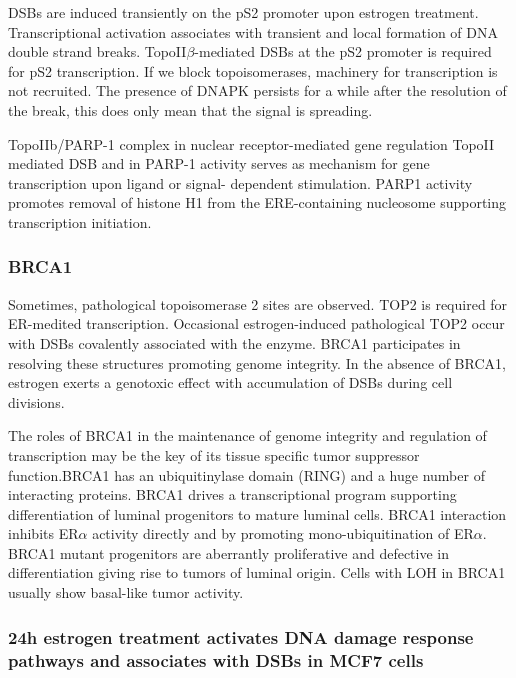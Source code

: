 DSBs are induced transiently on the pS2 promoter upon estrogen treatment. Transcriptional activation associates with transient and local formation of DNA double strand breaks. TopoII$\beta$-mediated DSBs at the pS2 promoter is required for pS2 transcription. If we block topoisomerases, machinery for transcription is not recruited. The presence of DNAPK persists for a while after the resolution of the break, this does only mean that the signal is spreading.

TopoIIb/PARP-1 complex in nuclear receptor-mediated gene regulation TopoII mediated DSB and in PARP-1 activity serves as mechanism for gene transcription upon ligand or signal- dependent stimulation. PARP1 activity promotes removal of histone H1 from the ERE-containing nucleosome supporting transcription initiation.

\hypertarget{brca1}{%
\subsubsection{BRCA1}\label{brca1}}

Sometimes, pathological topoisomerase 2 sites are observed. TOP2 is required for ER-medited transcription. Occasional estrogen-induced pathological TOP2 occur with DSBs covalently associated with the enzyme. BRCA1 participates in resolving these structures promoting genome integrity. In the absence of BRCA1, estrogen exerts a genotoxic effect with accumulation of DSBs during cell divisions.

The roles of BRCA1 in the maintenance of genome integrity and regulation of transcription may be the key of its tissue specific tumor suppressor function.BRCA1 has an ubiquitinylase domain (RING) and a huge number of interacting proteins. BRCA1 drives a transcriptional program supporting differentiation of luminal progenitors to mature luminal cells. BRCA1 interaction inhibits ER$\alpha$ activity directly and by promoting mono-ubiquitination of ER$\alpha$. BRCA1 mutant progenitors are aberrantly proliferative and defective in differentiation giving rise to tumors of luminal origin. Cells with LOH in BRCA1 usually show basal-like tumor activity.

\hypertarget{stark-et-al.}{%
\subsubsection{24h estrogen treatment activates DNA damage response pathways and associates with DSBs in MCF7 cells}\label{stark-et-al.}}

